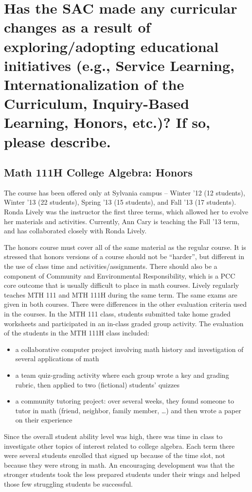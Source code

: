 \section[Curricular changes resulting from educational initiatives]{Has the SAC made any curricular changes as a result of exploring/adopting educational initiatives (e.g., Service Learning, Internationalization of the Curriculum, Inquiry-Based Learning, Honors, etc.)?  If so, please describe.}


\subsection{Math 111H College Algebra: Honors}

The course has been offered only at Sylvania campus -- Winter '12 (12 students), Winter '13 (22 students), Spring '13 (15 students), and Fall '13 (17 students).  Ronda Lively was the instructor the first three terms, which allowed her to evolve her materials and activities. Currently, Ann Cary is teaching the Fall '13 term, and has collaborated closely with Ronda Lively. 

The honors course must cover all of the same material as the regular course. It is stressed that honors versions of a course should not be ``harder'', but different in the use of class time and activities/assignments.  There should also be a component of Community and Environmental Responsibility, which is a PCC core outcome that is usually difficult to place in math courses.  Lively regularly teaches MTH 111 and MTH 111H during the same term.  The same exams are given in both courses.  There were differences in the other evaluation criteria used in the courses.  In the MTH 111 class, students submitted take home graded worksheets and participated in an in-class graded group activity.  The evaluation of the students in the MTH 111H class included:
\begin{itemize}
\item a collaborative computer project involving math history and investigation of several applications of math
\item a team quiz-grading activity where each group wrote a key and grading rubric, then applied to two (fictional) students' quizzes
\item a community tutoring project:  over several weeks, they found someone to tutor in math (friend, neighbor, family member, \ldots) and then wrote a paper on their experience
\end{itemize}
Since the overall student ability level was high, there was time in class to investigate other topics of interest related to college algebra.  Each term there were several students enrolled that signed up because of the time slot, not because they were strong in math.  An encouraging development was that the stronger students took the less prepared students under their wings and helped those few struggling students be successful.


